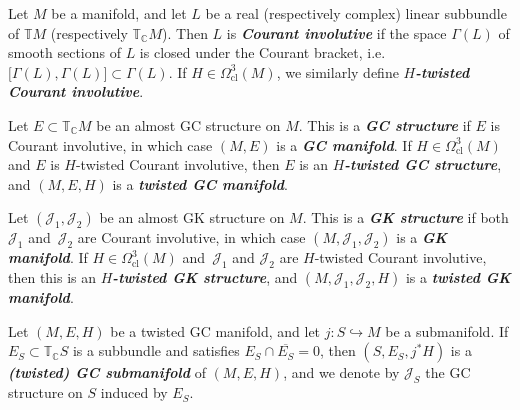 \documentclass{article}
\numberwithin{equation}{section}
\newcommand{\deff}[1]{\textbf{\emph{#1}}}
\newcommand{\hookfunc}[3]{#1 \colon #2 \hookrightarrow #3}
\newcommand{\pont}[1]{\mathbb{T} {#1}}
\newcommand{\cpont}[1]{\mathbb{T}_{\mathbb{C}} {#1}}
\begin{document}
\begin{Definition}
Let $M$ be a manifold, and let $L$ be a real (respectively complex) linear subbundle of $\pont{M}$ (respectively $\cpont{M}$).  Then $L$ is \deff{Courant involutive} if the space $\Gamma(L)$ of smooth sections of $L$ is closed under the Courant bracket, i.e. $\big[ \Gamma(L), \Gamma(L) \big] \subset \Gamma(L)$.  If $H \in \Omega_{\text{cl}}^3(M)$, we similarly def\/ine \deff{$H$-twisted Courant involutive}.

Let $E \subset \cpont{M}$ be an almost GC structure on $M$.  This is a \deff{GC structure} if $E$ is Courant involutive, in which case $(M,E)$ is a \deff{GC manifold}.  If $H \in \Omega_{\text{cl}}^3(M)$ and $E$ is $H$-twisted Courant involutive, then $E$ is an \deff{$H$-twisted GC structure}, and $(M,E,H)$ is a \deff{twisted GC manifold}.

Let $(\mathcal{J}_1, \mathcal{J}_2)$ be an almost GK structure on $M$.  This is a \deff{GK structure} if both $\mathcal{J}_1$ and~$\mathcal{J}_2$ are Courant involutive, in which case $(M,\mathcal{J}_1,\mathcal{J}_2)$ is a \deff{GK manifold}.  If $H \in \Omega_{\text{cl}}^3(M)$ and~$\mathcal{J}_1$ and $\mathcal{J}_2$ are $H$-twisted Courant involutive, then this is an \deff{$H$-twisted GK structure}, and $(M,\mathcal{J}_1,\mathcal{J}_2,H)$ is a \deff{twisted GK manifold}.
\end{Definition}

\begin{Definition}
Let $(M,E,H)$ be a twisted GC manifold, and let $\hookfunc{j}{S}{M}$ be a submanifold.  If $E_S \subset \cpont{S}$ is a subbundle and satisf\/ies $E_S \cap \overline{E_S} = 0$, then $(S,E_S,j^* H)$ is a \deff{(twisted) GC submanifold} of $(M,E,H)$, and we denote by $\mathcal{J}_S$ the GC structure on $S$ induced by $E_S$.
\end{Definition}
\end{document}
